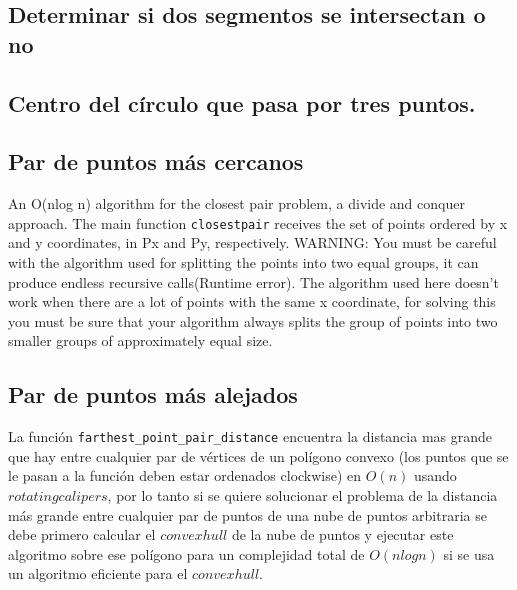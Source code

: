 \documentclass[10pt,letterpaper,twocolumn,twosided]{article}
\newcommand{\codigofuente}[1]{

\dotfill
}
\begin{document}
\codigofuente{src/geom/inter_dos_segmentos.cpp}

\subsection{Determinar si dos segmentos se intersectan o no}

\codigofuente{src/geom/inter_dos_segmentos_si_no.cpp}

\subsection{Centro del círculo que pasa por tres puntos.}

\codigofuente{src/geom/centro_circulo_ters_puntos.cpp}

\subsection{Par de puntos más cercanos} 

An O(nlog n) algorithm for the closest pair problem, a divide and conquer approach. The main function \verb+closestpair+ receives the set of points ordered by x and y coordinates, in Px and Py, respectively.
WARNING: You must be careful with the algorithm used for splitting the points into two equal groups, it can produce endless recursive calls(Runtime error). The algorithm used here doesn't work when there are a lot of points with the same x coordinate, for solving this you must be sure that your algorithm always splits the group of points into two smaller groups of approximately equal size. 
 
\codigofuente{src/geom/closestpair.cpp}

\subsection{Par de puntos más alejados}

La función \verb+farthest_point_pair_distance+ encuentra la distancia mas grande que hay entre cualquier par de vértices de un polígono convexo (los puntos que se le pasan a la función deben estar ordenados clockwise) en $O(n)$ usando $rotating calipers$, por lo tanto si se quiere solucionar el problema de la distancia más grande entre cualquier par de puntos de una nube de puntos arbitraria se debe primero calcular el $convexhull$ de la nube de puntos y ejecutar este algoritmo sobre ese polígono para un complejidad total de $O(nlogn)$ si se usa un algoritmo eficiente para el $convexhull$.
\end{document}

